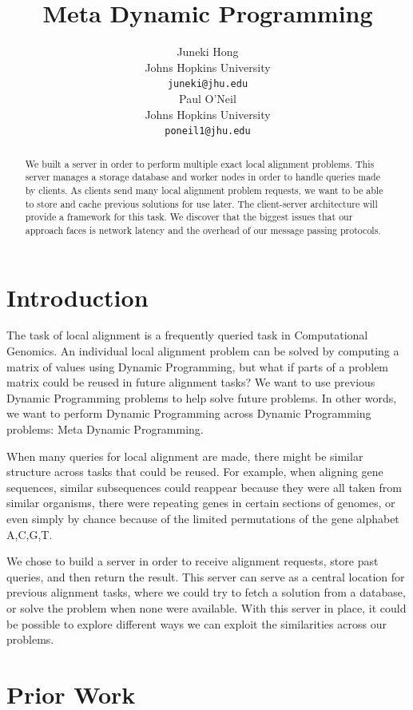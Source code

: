 \documentclass[11pt]{article}
\title{Meta Dynamic Programming}
\author{Juneki Hong \\
  Johns Hopkins University \\
  {\tt juneki@jhu.edu} \\\And
  Paul O'Neil \\
  Johns Hopkins University \\
  {\tt poneil1@jhu.edu} \\}
\date{}
\begin{document}
\maketitle
\begin{abstract}
  We built a server in order to perform multiple exact local alignment problems. This server manages a storage database and worker nodes in order to handle queries made by clients. As clients send many local alignment problem requests, we want to be able to store and cache previous solutions for use later. The client-server architecture will provide a framework for this task. We discover that the biggest issues that our approach faces is network latency and the overhead of our message passing protocols. 
\end{abstract}


\section{Introduction}
The task of local alignment is a frequently queried task in Computational Genomics. 
An individual local alignment problem can be solved by computing a matrix of values using Dynamic Programming, but what if parts of a problem matrix could be reused in future alignment tasks? We want to use previous Dynamic Programming problems to help solve future problems. In other words, we want to perform Dynamic Programming across Dynamic Programming problems: Meta Dynamic Programming.

When many queries for local alignment are made, there might be similar structure across tasks that could be reused. For example, when aligning gene sequences, similar subsequences could reappear because they were all taken from similar organisms, there were repeating genes in certain sections of genomes, or even simply by chance because of the limited permutations of the gene alphabet A,C,G,T.

We chose to build a server in order to receive alignment requests, store past queries, and then return the result. This server can serve as a central location for previous alignment tasks, where we could try to fetch a solution from a database, or solve the problem when none were available. With this server in place, it could be possible to explore different ways we can exploit the similarities across our problems.
 



\section{Prior Work}
\end{document}
